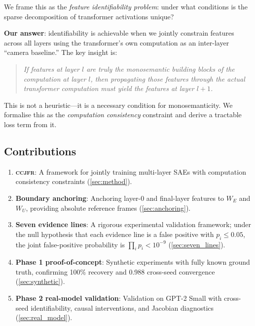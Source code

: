 \documentclass[12pt,a4paper]{article}
\newcommand{\CCJFR}{\textsc{ccjfr}}
\begin{document}
We frame this as the \emph{feature identifiability problem}: under what conditions
is the sparse decomposition of transformer activations unique?

\textbf{Our answer}: identifiability is achievable when we jointly constrain
features across all layers using the transformer's own computation as an
inter-layer ``camera baseline.'' The key insight is:

\begin{quote}
\emph{If features at layer $l$ are truly the monosemantic building blocks of
the computation at layer $l$, then propagating those features through the actual
transformer computation must yield the features at layer $l+1$.}
\end{quote}

This is not a heuristic—it is a necessary condition for monosemanticity.
We formalise this as the \emph{computation consistency} constraint and derive
a tractable loss term from it.

\subsection{Contributions}
\begin{enumerate}
  \item \textbf{\CCJFR{}}: A framework for jointly training multi-layer SAEs
    with computation consistency constraints (\cref{sec:method}).
  \item \textbf{Boundary anchoring}: Anchoring layer-0 and final-layer features
    to $W_E$ and $W_U$, providing absolute reference frames (\cref{sec:anchoring}).
  \item \textbf{Seven evidence lines}: A rigorous experimental validation
    framework; under the null hypothesis that each evidence line is a false positive
    with $p_i \leq 0.05$, the joint false-positive probability is $\prod_i p_i < 10^{-9}$
    (\cref{sec:seven_lines}).
  \item \textbf{Phase 1 proof-of-concept}: Synthetic experiments with fully
    known ground truth, confirming 100\% recovery and 0.988 cross-seed
    convergence (\cref{sec:synthetic}).
  \item \textbf{Phase 2 real-model validation}: Validation on GPT-2 Small with
    cross-seed identifiability, causal interventions, and Jacobian diagnostics
    (\cref{sec:real_model}).
\end{enumerate}

\end{document}
